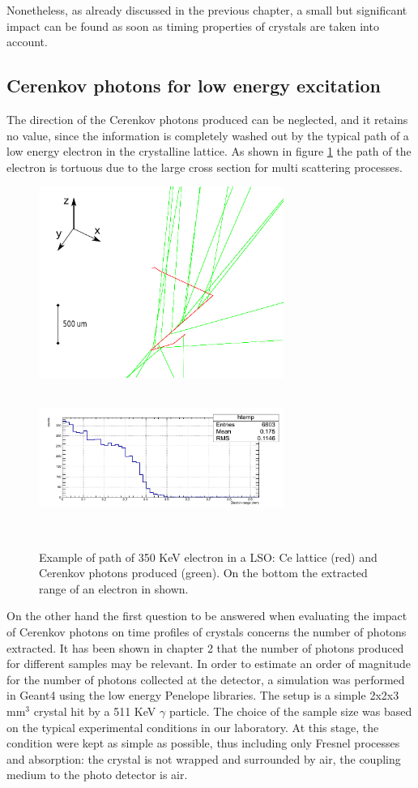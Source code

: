 Nonetheless, as already discussed in the previous chapter, a small but significant impact can be found as soon as timing properties of crystals are taken into account.
\subsection{Cerenkov photons for low energy excitation}
The direction of the Cerenkov photons produced can be neglected, and it retains no value, since the information is completely washed out by the typical path of a low energy electron in the crystalline lattice.
As shown in figure \ref{fig:electron} the path of the electron is tortuous due to the large cross section for multi scattering processes.
\begin{figure}[htbp]
\begin{center}
\includegraphics[width=8cm]{../Pictures/Chapter_5/white.png}
\includegraphics[width=8cm, height=5cm]{../Pictures/Chapter_5/range.png}
\end{center}
\caption[Electron path in lattice]{Example of path of 350 KeV electron in a LSO: Ce lattice (red) and Cerenkov photons produced (green). On the bottom the extracted range of an electron in shown.}
\label{fig:electron}
\end{figure}

On the other hand the first question to be answered when evaluating the impact of Cerenkov photons on time profiles of crystals concerns the number of photons extracted.
It has been shown in chapter 2 that the number of photons produced for different samples may be relevant. 
In order to estimate an order of magnitude for the number of photons collected at the detector, a simulation was performed in Geant4 using the low energy Penelope libraries. The setup is a simple 2x2x3 mm$^{3}$ crystal hit by a 511 KeV $\gamma$ particle. The choice of the sample size was based on the typical experimental conditions in our laboratory. At this stage, the condition were kept as simple as possible, thus including only Fresnel processes and absorption: the crystal is not wrapped and surrounded by air, the coupling medium to the photo detector is air.

